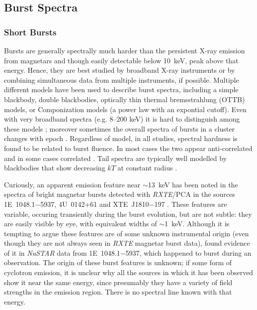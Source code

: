 


\subsection{Burst Spectra}
\label{sec:burstspectra}

\subsubsection{Short Bursts}

Bursts are generally spectrally much harder than the persistent X-ray
emission from magnetars and though easily detectable below 10~keV,
peak above that energy.  Hence, they are best studied by broadband
X-ray instruments or by combining simultaneous data from multiple
instruments, if possible.  Multiple different models have been used
to describe burst spectra, including a simple blackbody, double
blackbodies, optically thin thermal bremsstrahlung (OTTB) models, or
Componization models (a power law with an expontial cutoff).  Even with
very broadband spectra (e.g. 8--200 keV) it is hard to distinguish among
these models \citep[e.g.][]{vkg+12}; moreover
sometimes the overall spectra of bursts in a cluster changes with epoch
\citep[e.g.][]{vgk+12}.  Regardless of model, in all studies, spectral
hardness is found to be related to burst fluence.  In most cases the
two appear anti-correlated \citep{gwk+99,gwk+00,gkw+01,vkg+12} and in
some cases correlated \citep{gkw04}.  Tail spectra are typically well
modelled by blackbodies that show decreasing $kT$ at constant radius
\citep[e.g.][]{gwk+11,akb+14}.



Curiously, an apparent emission feature near
$\sim$13~keV has been noted in the spectra of bright magnetar bursts detected with {\it
RXTE}/PCA in the sources 1E~1048.1$-$5937, 4U~0142+61 and XTE~J1810$-$197
\citep{gkw02,wkg+05,gdk11,cgsk16}.  These features are variable,
occuring transiently during the burst evolution, but are not subtle:
they are easily visible by eye, with equivalent widths of $\sim$1~keV.
Although it is tempting to argue these features are of some unknown
instrumental origin (even though they are not always seen in {\it RXTE}
magnetar burst data), \citet{akb+14} found evidence of it in {\it NuSTAR}
data from 1E~1048.1$-$5937, which happened to burst during an observation.
The origin of these burst features is unknown; if some form of cyclotron
emission, it is unclear why all the sources in which it has been observed
show it near the same energy, since presumably they have a variety of
field strengths in the emission region. There is no spectral line known
with that energy.

